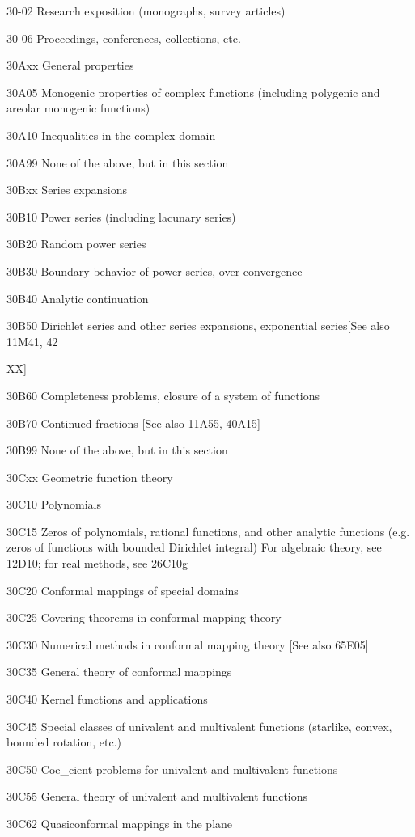 \documentclass[12pt]{article}
\theoremstyle{plain}
\theoremstyle{definition}
\numberwithin{equation}{section}
\begin{document}
{{30-02 Research exposition (monographs, survey articles)

30-06 Proceedings, conferences, collections, etc.

30Axx General properties

30A05 Monogenic properties of complex functions (including polygenic and areolar monogenic functions)

30A10 Inequalities in the complex domain

30A99 None of the above, but in this section

30Bxx Series expansions

30B10 Power series (including lacunary series)

30B20 Random power series

30B30 Boundary behavior of power series, over-convergence

30B40 Analytic continuation

30B50 Dirichlet series and other series expansions, exponential series[See also 11M41, 42{XX]

30B60 Completeness problems, closure of a system of functions

30B70 Continued fractions [See also 11A55, 40A15]

30B99 None of the above, but in this section

30Cxx Geometric function theory

30C10 Polynomials

30C15 Zeros of polynomials, rational functions, and other analytic functions (e.g. zeros of functions with bounded Dirichlet integral) For algebraic theory, see 12D10; for real methods, see 26C10g

30C20 Conformal mappings of special domains

30C25 Covering theorems in conformal mapping theory

30C30 Numerical methods in conformal mapping theory [See also 65E05]

30C35 General theory of conformal mappings

30C40 Kernel functions and applications

30C45 Special classes of univalent and multivalent functions (starlike, convex, bounded rotation, etc.)

30C50 Coe_cient problems for univalent and multivalent functions

30C55 General theory of univalent and multivalent functions

30C62 Quasiconformal mappings in the plane

}}}
\end{document}
